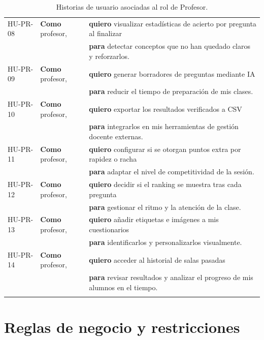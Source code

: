 \begin{table}[H]
{\begin{tabularx}{1.1\textwidth}{l l Y}
HU-PR-08\label{hu:pr-08} & \textbf{Como} profesor, & \textbf{quiero} visualizar estadísticas de acierto por pregunta al finalizar \\
                                  && \textbf{para} detectar conceptos que no han quedado claros y reforzarlos. \\ \hline
HU-PR-09\label{hu:pr-09} & \textbf{Como} profesor, & \textbf{quiero} generar borradores de preguntas mediante IA \\
                                  && \textbf{para} reducir el tiempo de preparación de mis clases. \\ \hline
HU-PR-10\label{hu:pr-10} & \textbf{Como} profesor, & \textbf{quiero} exportar los resultados verificados a CSV \\
                                  && \textbf{para} integrarlos en mis herramientas de gestión docente externas. \\ \hline
HU-PR-11\label{hu:pr-11} & \textbf{Como} profesor, & \textbf{quiero} configurar si se otorgan puntos extra por rapidez o racha \\
                                  && \textbf{para} adaptar el nivel de competitividad de la sesión. \\ \hline
HU-PR-12\label{hu:pr-12} & \textbf{Como} profesor, & \textbf{quiero} decidir si el ranking se muestra tras cada pregunta \\
                                  && \textbf{para} gestionar el ritmo y la atención de la clase. \\ \hline
HU-PR-13\label{hu:pr-13} & \textbf{Como} profesor, & \textbf{quiero} añadir etiquetas e imágenes a mis cuestionarios \\
                                  && \textbf{para} identificarlos y personalizarlos visualmente. \\ \hline
HU-PR-14\label{hu:pr-14} & \textbf{Como} profesor, & \textbf{quiero} acceder al historial de salas pasadas \\
                                  && \textbf{para} revisar resultados y analizar el progreso de mis alumnos en el tiempo. \\ \bighline
\end{tabularx}%
}
\caption{Historias de usuario asociadas al rol de Profesor.}
\label{tab:hu_profesor}
\end{table}

\section{Reglas de negocio y restricciones}\label{sec:reglas_de_negocio_y_restricciones}

